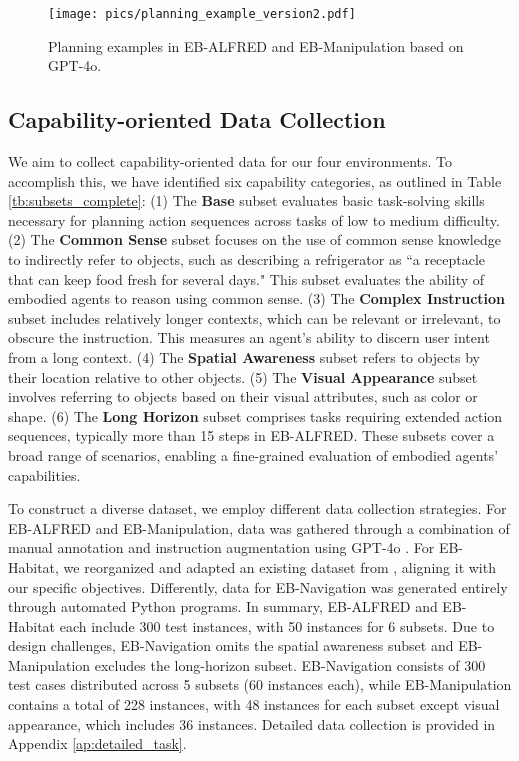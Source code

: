 \begin{figure*}[h!]
\begin{center}
\vspace{-5pt}
\texttt{[image: pics/planning\_example\_version2.pdf]}
\end{center}
\vspace{-1em}
\caption{Planning examples in EB-ALFRED and EB-Manipulation based on GPT-4o.}
\label{fig:example_alfred_man_4o}
\vspace{-1.2em}
\end{figure*}


\vspace{-0.4em}
\subsection{Capability-oriented Data Collection}
We aim to collect capability-oriented data for our four environments. To accomplish this, we have identified six capability categories, as outlined in Table \ref{tb:subsets_complete}: (1) The \textbf{Base} subset evaluates basic task-solving skills necessary for planning action sequences across tasks of low to medium difficulty. (2) The \textbf{Common Sense} subset focuses on the use of common sense knowledge to indirectly refer to objects, such as describing a refrigerator as ``a receptacle that can keep food fresh for several days." This subset evaluates the ability of embodied agents to reason using common sense. (3) The \textbf{Complex Instruction} subset includes relatively longer contexts, which can be relevant or irrelevant, to obscure the instruction. This measures an agent's ability to discern user intent from a long context. (4) The \textbf{Spatial Awareness} subset refers to objects by their location relative to other objects. (5) The \textbf{Visual Appearance} subset involves referring to objects based on their visual attributes, such as color or shape. (6) The \textbf{Long Horizon} subset comprises tasks requiring extended action sequences, typically more than 15 steps in EB-ALFRED. These subsets cover a broad range of scenarios, enabling a fine-grained evaluation of embodied agents' capabilities.

To construct a diverse dataset, we employ different data collection strategies. For EB-ALFRED and EB-Manipulation, data was gathered through a combination of manual annotation and instruction augmentation using GPT-4o \cite{GPT-4o}. For EB-Habitat, we reorganized and adapted an existing dataset from \cite{szot2023large}, aligning it with our specific objectives. Differently, data for EB-Navigation was generated entirely through automated Python programs. In summary, EB-ALFRED and EB-Habitat each include 300 test instances, with 50 instances for 6 subsets. Due to design challenges, EB-Navigation omits the spatial awareness subset and EB-Manipulation excludes the long-horizon subset. EB-Navigation consists of 300 test cases distributed across 5 subsets (60 instances each), while EB-Manipulation contains a total of 228 instances, with 48 instances for each subset except visual appearance, which includes 36 instances. Detailed data collection is provided in Appendix \ref{ap:detailed_task}.

